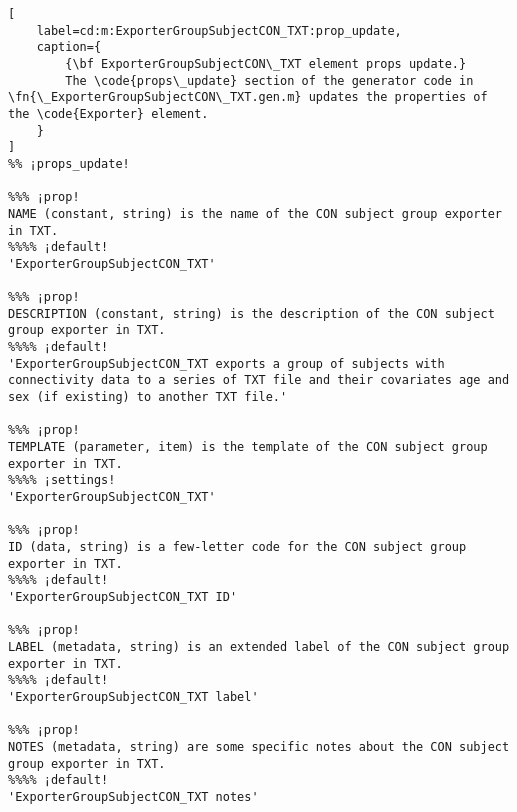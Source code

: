 \documentclass{tufte-handout}
\begin{document}
\begin{lstlisting}[
	label=cd:m:ExporterGroupSubjectCON_TXT:prop_update,
	caption={
		{\bf ExporterGroupSubjectCON\_TXT element props update.}
		The \code{props\_update} section of the generator code in \fn{\_ExporterGroupSubjectCON\_TXT.gen.m} updates the properties of the \code{Exporter} element.
	}
]
%% ¡props_update!

%%% ¡prop!
NAME (constant, string) is the name of the CON subject group exporter in TXT.
%%%% ¡default!
'ExporterGroupSubjectCON_TXT'

%%% ¡prop!
DESCRIPTION (constant, string) is the description of the CON subject group exporter in TXT.
%%%% ¡default!
'ExporterGroupSubjectCON_TXT exports a group of subjects with connectivity data to a series of TXT file and their covariates age and sex (if existing) to another TXT file.'

%%% ¡prop!
TEMPLATE (parameter, item) is the template of the CON subject group exporter in TXT.
%%%% ¡settings!
'ExporterGroupSubjectCON_TXT'

%%% ¡prop!
ID (data, string) is a few-letter code for the CON subject group exporter in TXT.
%%%% ¡default!
'ExporterGroupSubjectCON_TXT ID'

%%% ¡prop!
LABEL (metadata, string) is an extended label of the CON subject group exporter in TXT.
%%%% ¡default!
'ExporterGroupSubjectCON_TXT label'

%%% ¡prop!
NOTES (metadata, string) are some specific notes about the CON subject group exporter in TXT.
%%%% ¡default!
'ExporterGroupSubjectCON_TXT notes'
\end{lstlisting}
\end{document}
